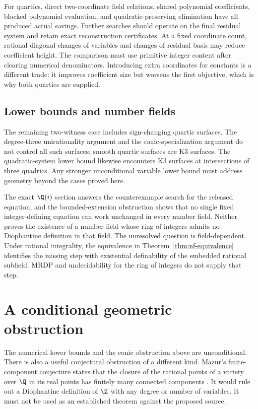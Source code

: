 For quartics, direct two-coordinate field relations, shared polynomial
coefficients, blocked polynomial evaluation, and quadratic-preserving
elimination have all produced actual savings. Further searches should
operate on the final residual system and retain exact reconstruction
certificates. At a fixed coordinate count, rational diagonal changes of
variables and changes of residual basis may reduce coefficient height.
The comparison must use primitive integer content after clearing
numerical denominators. Introducing extra coordinates for constants is a
different trade: it improves coefficient size but worsens the first
objective, which is why both quartics are supplied.

\subsection{Lower bounds and number fields}

The remaining two-witness case includes sign-changing quartic surfaces.
The degree-three unirationality argument and the conic-specialization
argument do not control all such surfaces; smooth quartic surfaces are
K3 surfaces. The quadratic-system lower bound likewise encounters K3
surfaces at intersections of three quadrics. Any stronger unconditional
variable lower bound must address geometry beyond the cases proved here.

The exact $\Q(i)$ section answers the counterexample search for the
released equation, and the bounded-extension obstruction shows that no
single fixed integer-defining equation can work unchanged in every number
field. Neither proves the existence of a number field whose ring of
integers admits no Diophantine definition in that field. The unresolved
question is field-dependent. Under rational integrality, the equivalence
in Theorem~\ref{thm:nf-equivalence} identifies the missing step with
existential definability of the embedded rational subfield. MRDP and
undecidability for the ring of integers do not supply that step.

\section{A conditional geometric obstruction}
\label{sec:mazur}

The numerical lower bounds and the conic obstruction above are
unconditional. There is also a useful
conjectural obstruction of a different kind. Mazur's finite-component
conjecture states that the closure of the rational points of a variety
over $\Q$ in its real points has finitely many connected components
\cite[Conjecture 3]{Mazur1995}. It would rule out a Diophantine
definition of $\Z$ with any degree or number of variables. It must
not be used as an established theorem against the proposed source.

